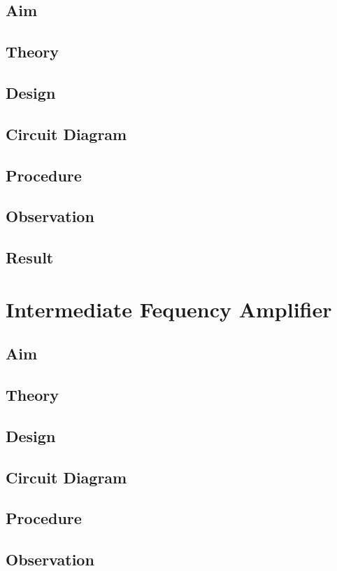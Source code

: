 \documentclass{book}
\begin{document}
\section*{Aim}
\section*{Theory}
\section*{Design}
\section*{Circuit Diagram}
\section*{Procedure}
\section*{Observation}
\section*{Result}

\chapter[Intermediate Fequency Amplifier]{Intermediate Fequency Amplifier}
\section*{Aim}
\section*{Theory}
\section*{Design}
\section*{Circuit Diagram}
\section*{Procedure}
\section*{Observation}
\end{document}
